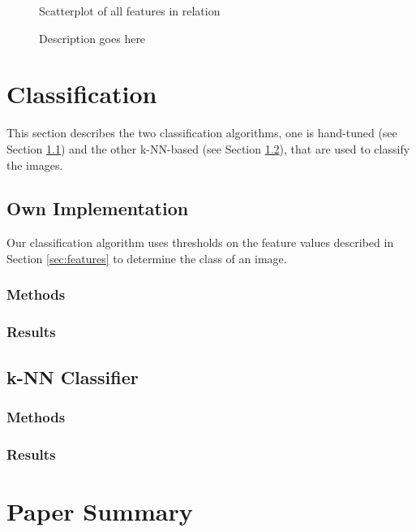 \documentclass[a4paper,psfig,subfigure,epsfig,fleqn,amssmb,float,caption,fontenc,ausarbeitung]{article}
\begin{document}
\begin{figure}
	\centering
	\setlength\figureheight{4cm} 
	\setlength\figurewidth{10cm}
	
	\caption{Scatterplot of all features in relation}
	\label{fig:gscatter}
\end{figure}

\begin{figure}
	\centering
	\setlength\figureheight{7cm} 
	\setlength\figurewidth{9cm}
	
	\caption{Description goes here}
	\label{fig:results}
\end{figure}





\section{Classification}
\label{sec:classification}
This section describes the two classification algorithms, one is hand-tuned (see Section \ref{sec:own}) and the other k-NN-based (see Section \ref{sec:kNN}), that are used to classify the images. 

\subsection{Own Implementation}
\label{sec:own}
Our classification algorithm uses thresholds on the feature values described in Section \ref{sec:features} to determine the class of an image.

\subsubsection{Methods}
\label{sec:ownMethods}

\subsubsection{Results}
\label{sec:ownResults}

\subsection{k-NN Classifier}
\label{sec:kNN}

\subsubsection{Methods}
\label{sec:kNNMethods}

\subsubsection{Results}
\label{sec:kNNResults}

\section{Paper Summary}
\label{sec:paperSummary}
\cite{beyer1999nearest}



\fontsize{9}{10pt}


\end{document}
